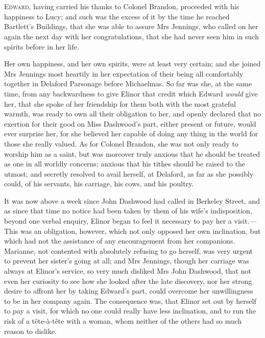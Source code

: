 \chapter[Chapter \thechapter]{}
\lettrine[lraise=0.3]{E}{dward}, having carried his thanks to Colonel Brandon, proceeded with his happiness to Lucy; and such was the excess of it by the time he reached Bartlett's Buildings, that she was able to assure Mrs Jennings, who called on her again the next day with her congratulations, that she had never seen him in such spirits before in her life.

Her own happiness, and her own spirits, were at least very certain; and she joined Mrs Jennings most heartily in her expectation of their being all comfortably together in Delaford Parsonage before Michaelmas. So far was she, at the same time, from any backwardness to give Elinor that credit which Edward \textit{would} give her, that she spoke of her friendship for them both with the most grateful warmth, was ready to own all their obligation to her, and openly declared that no exertion for their good on Miss Dashwood's part, either present or future, would ever surprise her, for she believed her capable of doing any thing in the world for those she really valued. As for Colonel Brandon, she was not only ready to worship him as a saint, but was moreover truly anxious that he should be treated as one in all worldly concerns; anxious that his tithes should be raised to the utmost; and secretly resolved to avail herself, at Delaford, as far as she possibly could, of his servants, his carriage, his cows, and his poultry.

It was now above a week since John Dashwood had called in Berkeley Street, and as since that time no notice had been taken by them of his wife's indisposition, beyond one verbal enquiry, Elinor began to feel it necessary to pay her a visit.—This was an obligation, however, which not only opposed her own inclination, but which had not the assistance of any encouragement from her companions. Marianne, not contented with absolutely refusing to go herself, was very urgent to prevent her sister's going at all; and Mrs Jennings, though her carriage was always at Elinor's service, so very much disliked Mrs John Dashwood, that not even her curiosity to see how she looked after the late discovery, nor her strong desire to affront her by taking Edward's part, could overcome her unwillingness to be in her company again. The consequence was, that Elinor set out by herself to pay a visit, for which no one could really have less inclination, and to run the risk of a tête-à-tête with a woman, whom neither of the others had so much reason to dislike.

